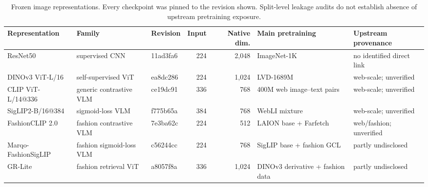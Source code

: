 \begin{table}[htbp]
\caption{Frozen image representations. Every checkpoint was pinned to the revision shown. Split-level leakage audits do not establish absence of upstream pretraining exposure.}
\label{tab:representations}
\centering
\scriptsize
\begin{tabular}{l l l r r l l}
\toprule
Representation & Family & Revision & Input & Native dim. & Main pretraining & Upstream provenance \\
\midrule
ResNet50 & supervised CNN & 11ad3fa6 & 224 & 2,048 & ImageNet-1K & no identified direct link \\
DINOv3 ViT-L/16 & self-supervised ViT & ea8dc286 & 224 & 1,024 & LVD-1689M & web-scale; unverified \\
CLIP ViT-L/14@336 & generic contrastive VLM & ce19dc91 & 336 & 768 & 400M web image--text pairs & web-scale; unverified \\
SigLIP2-B/16@384 & sigmoid-loss VLM & f775b65a & 384 & 768 & WebLI mixture & web-scale; unverified \\
FashionCLIP 2.0 & fashion contrastive VLM & 7e3ba62c & 224 & 512 & LAION base + Farfetch & web/fashion; unverified \\
Marqo-FashionSigLIP & fashion sigmoid-loss VLM & c56244cc & 224 & 768 & SigLIP base + fashion GCL & partly undisclosed \\
GR-Lite & fashion retrieval ViT & a8057f8a & 336 & 1,024 & DINOv3 derivative + fashion data & partly undisclosed \\
\bottomrule
\end{tabular}
\end{table}

